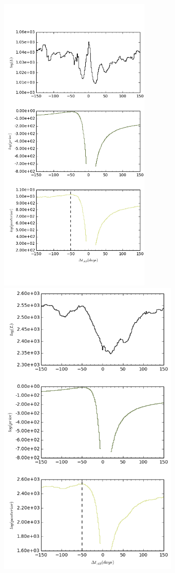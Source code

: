 \documentclass[\docopts]{\docclass}
\begin{document}
\begin{figure}[!h]
  \centering
  \begin{minipage}[bottom]{0.4\textwidth}
\includegraphics[width=\textwidth, height=15cm, keepaspectratio]{whiten1/data7_full_log.png}
  \end{minipage}
  \hfill
  \begin{minipage}[bottom]{0.4\textwidth}
\includegraphics[width=\textwidth, height=15cm, keepaspectratio]{whiten2/data7_full_log.png}

\end{minipage}
\end{figure}
\end{document}

